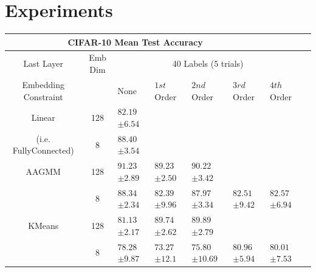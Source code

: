 \documentclass[10pt,twocolumn,letterpaper]{article}
\begin{document}
\section{Experiments}


\begin{table}[ht!]
	\begin{tabularx}{\textwidth}{c|c|XXXXXX}
		\multicolumn{6}{c}{CIFAR-10 Mean Test Accuracy} \\ \hline\hline
		Last Layer &   Emb Dim   & \multicolumn{5}{c}{40 Labels (5 trials)}            \\ 
		\hline
		Embedding Constraint  &  & None & $1st$ Order & $2nd$ Order & $3rd$ Order & $4th$ Order  \\ 
		\hline
		Linear & 128  & $82.19$ \scriptsize{$\pm 6.54$}   &  &  &  &   \\
		(i.e. FullyConnected) & 8  & $88.40$ \scriptsize{$\pm 3.54$}      &  &  &  &   \\
		\hline
		AAGMM & 128  & $\boldsymbol{91.23}$ \scriptsize{$\pm 2.89$}    & $89.23$ \scriptsize{$\pm 2.50$} & $90.22$ \scriptsize{$\pm 3.42$} &  &  \\
		& 8  & $88.34$ \scriptsize{$\pm 2.34$}    & $82.39$ \scriptsize{$\pm 9.96$} & $87.97$ \scriptsize{$\pm 3.34$} & $82.51$ \scriptsize{$\pm 9.42$} & $82.57$ \scriptsize{$\pm 6.94$} \\
		\hline
		KMeans & 128  & $81.13$ \scriptsize{$\pm 2.17$}    & $89.74$ \scriptsize{$\pm 2.62$} & $\boldsymbol{89.89}$ \scriptsize{$\pm 2.79$} &  &  \\
		& 8  & $78.28$ \scriptsize{$\pm 9.87$}    & $73.27$ \scriptsize{$\pm 12.1$} & $75.80$ \scriptsize{$\pm 10.69$} & $80.96$ \scriptsize{$\pm 5.94$} & $80.01$ \scriptsize{$\pm 7.53$}  \\
		

\end{tabularx}
\end{table}
\end{document}
